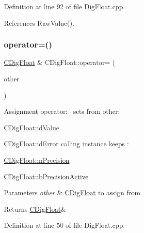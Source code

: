 Definition at line 92 of file Dig\+Float.\+cpp.



References Raw\+Value().

\mbox{\label{classCDigFloat_a74f36566c2c79d7258b7b2dee35d46b2}} 
\subsubsection{\texorpdfstring{operator=()}{operator=()}\hspace{0.1cm}{\footnotesize\ttfamily [1/2]}}
{\footnotesize\ttfamily \hyperlink{classCDigFloat}{C\+Dig\+Float} \& C\+Dig\+Float\+::operator= (\begin{DoxyParamCaption}\item[{const \hyperlink{classCDigFloat}{C\+Dig\+Float} \&}]{other }\end{DoxyParamCaption})}



Assignment operator\+:~\newline
 sets from other\+: 


\begin{DoxyItemize}
\item \hyperlink{classCDigFloat_a4bbe69e30dd4e20527362493aa9aaf96}{C\+Dig\+Float\+::d\+Value}
\item \hyperlink{classCDigFloat_a25eb3782d1e727ff007a48f8308e3d4d}{C\+Dig\+Float\+::d\+Error} calling instance keeps \+:
\item \hyperlink{classCDigFloat_ad580654be35246d14c91482581c0bc11}{C\+Dig\+Float\+::n\+Precision}
\item \hyperlink{classCDigFloat_aa1f6ed0312a2aa6ae5ee2abd195adefc}{C\+Dig\+Float\+::b\+Precision\+Active}
\end{DoxyItemize}


\begin{DoxyParams}{Parameters}
{\em other} & \hyperlink{classCDigFloat}{C\+Dig\+Float} to assign from \\
\hline
\end{DoxyParams}
\begin{DoxyReturn}{Returns}
\hyperlink{classCDigFloat}{C\+Dig\+Float}\& 
\end{DoxyReturn}


Definition at line 50 of file Dig\+Float.\+cpp.



